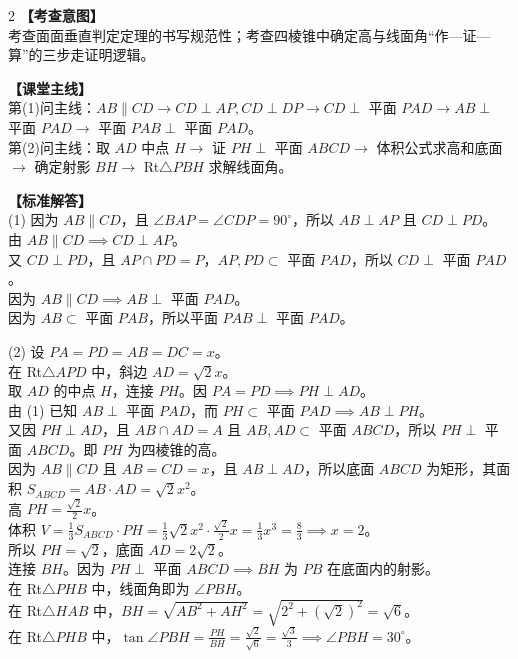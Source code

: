 \documentclass[11pt,a4paper]{ctexart}
\begin{document}
\begin{paracol}{2}
  \textbf{【考查意图】}\\
  考查面面垂直判定定理的书写规范性；考查四棱锥中确定高与线面角“作—证—算”的三步走证明逻辑。
  
  \textbf{【课堂主线】}\\
  第(1)问主线：$AB \parallel CD \to CD \perp AP, CD \perp DP \to CD \perp$ 平面 $PAD \to AB \perp$ 平面 $PAD \to$ 平面 $PAB \perp$ 平面 $PAD$。\\
  第(2)问主线：取 $AD$ 中点 $H \to$ 证 $PH \perp$ 平面 $ABCD \to$ 体积公式求高和底面 $\to$ 确定射影 $BH \to$ Rt$\triangle PBH$ 求解线面角。
  
  \textbf{【标准解答】}\\
  (1) 因为 $AB \parallel CD$，且 $\angle BAP=\angle CDP=90^\circ$，所以 $AB \perp AP$ 且 $CD \perp PD$。\\
  由 $AB \parallel CD \implies CD \perp AP$。\\
  又 $CD \perp PD$，且 $AP \cap PD = P$，$AP, PD \subset$ 平面 $PAD$，所以 $CD \perp$ 平面 $PAD$。\\
  因为 $AB \parallel CD \implies AB \perp$ 平面 $PAD$。\\
  因为 $AB \subset$ 平面 $PAB$，所以平面 $PAB \perp$ 平面 $PAD$。
  
  (2) 设 $PA=PD=AB=DC=x$。\\
  在 Rt$\triangle APD$ 中，斜边 $AD=\sqrt{2}x$。\\
  取 $AD$ 的中点 $H$，连接 $PH$。因 $PA=PD \implies PH \perp AD$。\\
  由 (1) 已知 $AB \perp$ 平面 $PAD$，而 $PH \subset$ 平面 $PAD \implies AB \perp PH$。\\
  又因 $PH \perp AD$，且 $AB \cap AD = A$ 且 $AB, AD \subset$ 平面 $ABCD$，所以 $PH \perp$ 平面 $ABCD$。即 $PH$ 为四棱锥的高。\\
  因为 $AB \parallel CD$ 且 $AB = CD = x$，且 $AB \perp AD$，所以底面 $ABCD$ 为矩形，其面积 $S_{ABCD} = AB \cdot AD = \sqrt{2}x^2$。\\
  高 $PH = \frac{\sqrt{2}}{2}x$。\\
  体积 $V = \frac{1}{3} S_{ABCD} \cdot PH = \frac{1}{3} \sqrt{2}x^2 \cdot \frac{\sqrt{2}}{2}x = \frac{1}{3}x^3 = \frac{8}{3} \implies x = 2$。\\
  所以 $PH = \sqrt{2}$，底面 $AD = 2\sqrt{2}$。\\
  连接 $BH$。因为 $PH \perp$ 平面 $ABCD \implies BH$ 为 $PB$ 在底面内的射影。\\
  在 Rt$\triangle PHB$ 中，线面角即为 $\angle PBH$。\\
  在 Rt$\triangle HAB$ 中，$BH = \sqrt{AB^2 + AH^2} = \sqrt{2^2 + (\sqrt{2})^2} = \sqrt{6}$。\\
  在 Rt$\triangle PHB$ 中，$\tan\angle PBH = \frac{PH}{BH} = \frac{\sqrt{2}}{\sqrt{6}} = \frac{\sqrt{3}}{3} \implies \angle PBH = 30^\circ$。
  

\end{paracol}
\end{document}
